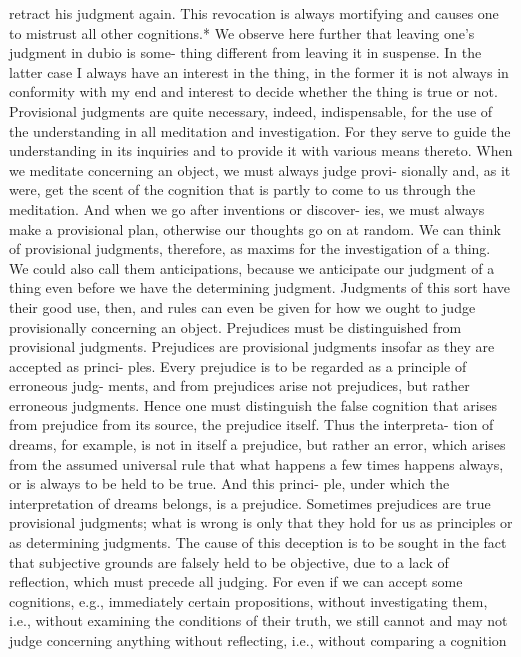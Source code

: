 retract his judgment again. This revocation is always mortifying and causes
one to mistrust all other cognitions.*
We observe here further that leaving one's judgment in dubio is some-
thing different from leaving it in suspense. In the latter case I always have
an interest in the thing, in the former it is not always in conformity with
my end and interest to decide whether the thing is true or not.
Provisional judgments are quite necessary, indeed, indispensable, for
the use of the understanding in all meditation and investigation. For they
serve to guide the understanding in its inquiries and to provide it with
various means thereto.
When we meditate concerning an object, we must always judge provi-
sionally and, as it were, get the scent of the cognition that is partly to come
to us through the meditation. And when we go after inventions or discover-
ies, we must always make a provisional plan, otherwise our thoughts go on
at random. We can think of provisional judgments, therefore, as maxims
for the investigation of a thing. We could also call them anticipations,
because we anticipate our judgment of a thing even before we have the
determining judgment. Judgments of this sort have their good use, then,
and rules can even be given for how we ought to judge provisionally
concerning an object.
Prejudices must be distinguished from provisional judgments.
Prejudices are provisional judgments insofar as they are accepted as princi-
ples. Every prejudice is to be regarded as a principle of erroneous judg-
ments, and from prejudices arise not prejudices, but rather erroneous
judgments. Hence one must distinguish the false cognition that arises
from prejudice from its source, the prejudice itself. Thus the interpreta-
tion of dreams, for example, is not in itself a prejudice, but rather an error,
which arises from the assumed universal rule that what happens a few
times happens always, or is always to be held to be true. And this princi-
ple, under which the interpretation of dreams belongs, is a prejudice.
Sometimes prejudices are true provisional judgments; what is wrong is
only that they hold for us as principles or as determining judgments. The
cause of this deception is to be sought in the fact that subjective grounds
are falsely held to be objective, due to a lack of reflection, which must
precede all judging. For even if we can accept some cognitions, e.g.,
immediately certain propositions, without investigating them, i.e., without
examining the conditions of their truth, we still cannot and may not judge
concerning anything without reflecting, i.e., without comparing a cognition
